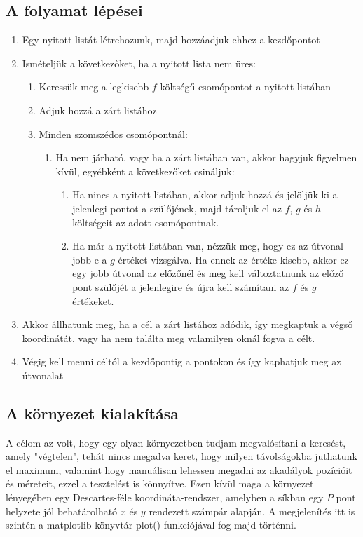 \subsection{A folyamat lépései}

\begin{enumerate}
	\item Egy nyitott listát létrehozunk, majd hozzáadjuk ehhez a kezdőpontot
	\item Ismételjük a következőket, ha a nyitott lista nem üres:
	\begin{enumerate}
		\item Keressük meg a legkisebb $ f $ költségű csomópontot a nyitott listában
		\item Adjuk hozzá a zárt listához
		\item Minden szomszédos csomópontnál:
			\begin{enumerate}
				\item Ha nem járható, vagy ha a zárt listában van, akkor hagyjuk figyelmen kívül, egyébként a következőket csináljuk:
					\begin{enumerate}
						\item Ha nincs a nyitott listában, akkor adjuk hozzá és jelöljük ki a jelenlegi pontot a szülőjének, majd tároljuk el az $ f $, $ g $ és $ h $ költségeit az adott csomópontnak.
						\item Ha már a nyitott listában van, nézzük meg, hogy ez az útvonal jobb-e a $ g $ értéket vizsgálva. Ha ennek az értéke kisebb, akkor ez egy jobb útvonal az előzőnél és meg kell változtatnunk az előző pont szülőjét a jelenlegire és újra kell számítani az $ f $ és $ g $ értékeket.  
					\end{enumerate}
			\end{enumerate}
	\end{enumerate}
	\item Akkor állhatunk meg, ha a cél a zárt listához adódik, így megkaptuk a végső koordinátát, vagy ha nem találta meg valamilyen oknál fogva a célt. 
	\item Végig kell menni céltól a kezdőpontig a pontokon és így kaphatjuk meg az útvonalat
\end{enumerate}

\subsection{A környezet kialakítása}

A célom az volt, hogy egy olyan környezetben tudjam megvalósítani a keresést, amely "végtelen", tehát nincs megadva keret, hogy milyen távolságokba juthatunk el maximum, valamint hogy manuálisan lehessen megadni az akadályok pozícióit és méreteit, ezzel a tesztelést is könnyítve. Ezen kívül maga a környezet lényegében egy Descartes-féle koordináta-rendszer, amelyben a síkban egy $ P $ pont helyzete jól behatárolható $ x $ és $ y $ rendezett számpár alapján. A megjelenítés itt is szintén a matplotlib könyvtár plot() funkciójával fog majd történni.

